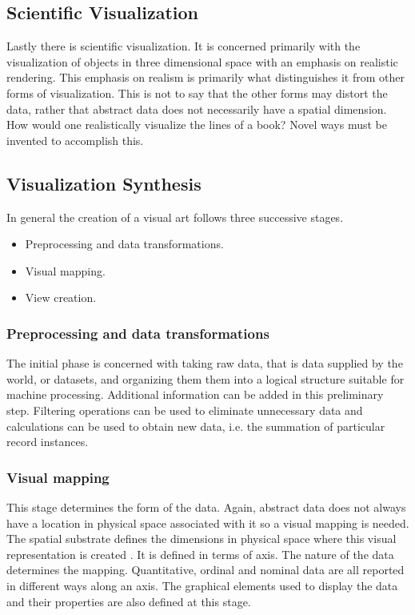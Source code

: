 \documentclass[a4paper, 10pt, titlepage]{article}
\begin{document}
\subsection{Scientific Visualization}
Lastly there is scientific visualization. It is concerned primarily with the visualization of objects in three dimensional space with an emphasis on realistic rendering. This emphasis on realism is primarily what distinguishes it from other forms of visualization. This is not to say that the other forms may distort the data, rather that abstract data does not necessarily have a spatial dimension. How would one realistically visualize the lines of a book? Novel ways must be invented to accomplish this.
\subsection{Visualization Synthesis}
In general the creation of a visual art follows three successive stages\cite{mazza2009introduction}.
\begin{itemize}
\item Preprocessing and data transformations.
\item Visual mapping.
\item View creation.
\end{itemize}
\subsubsection{Preprocessing and data transformations}
The initial phase is concerned with taking raw data, that is data supplied by the world, or datasets, and organizing them them into a logical structure suitable for machine processing. Additional information can be added in this preliminary step. Filtering operations can be used to eliminate unnecessary data and calculations can be used to obtain new data, i.e. the summation of particular record instances.
\subsubsection{Visual mapping}
This stage determines the form of the data. Again, abstract data does not always have a location in physical space associated with it so a visual mapping is needed. The spatial substrate defines the dimensions in physical space where this visual representation is created \cite{mazza2009introduction}. It is defined in terms of axis. The nature of the data determines the mapping. Quantitative, ordinal and nominal data are all reported in different ways along an axis. The graphical elements used to display the data and their properties are also defined at this stage.
\end{document}
